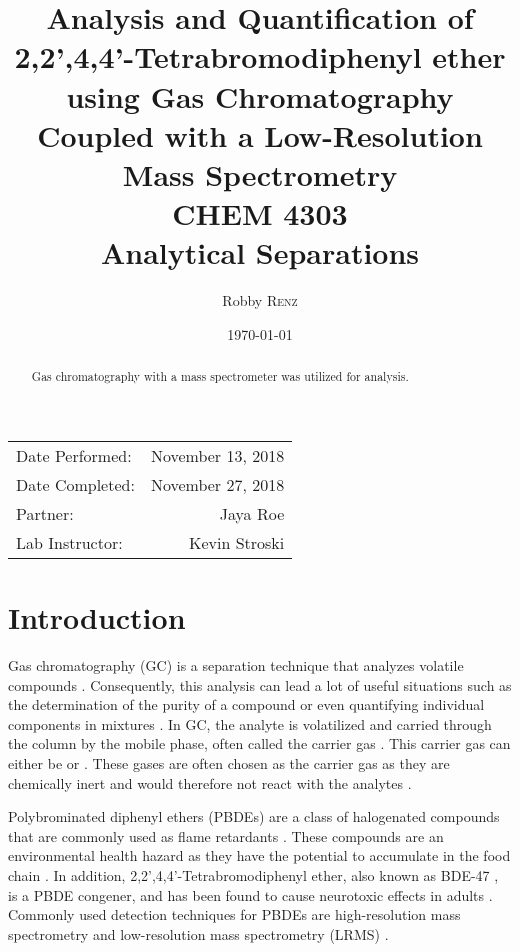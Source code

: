 \documentclass[a4paper, 12pt]{article}
\title{Analysis and Quantification of 2,2',4,4'-Tetrabromodiphenyl ether using Gas Chromatography Coupled with a Low-Resolution Mass Spectrometry \\ CHEM 4303 \\ Analytical Separations} %
\author{Robby \textsc{Renz}} %
\date{\today} %
\begin{document}
\maketitle %

\begin{center}
	\begin{tabular}{l r}
		Date Performed: & November 13, 2018 \\ %
		Date Completed: & November 27, 2018 \\
		Partner: & Jaya Roe \\ %
		Lab Instructor: & Kevin Stroski %
	\end{tabular}
\end{center}


\begin{abstract}
	Gas chromatography with a mass spectrometer was utilized for analysis.
\end{abstract}
\newpage


\section{Introduction}
Gas chromatography (GC) is a separation technique that analyzes volatile compounds \cite{vitha_chromatography:_2017}. Consequently, this analysis can lead a lot of useful situations such as the determination of the purity of a compound or even quantifying individual components in mixtures \cite{vitha_chromatography:_2017}. In GC, the analyte is volatilized and carried through the column by the mobile phase, often called the carrier gas \cite{harris}. This carrier gas can either be  or  \cite{harris}. These gases are often chosen as the carrier gas as they are chemically inert and would therefore not react with the analytes \cite{vitha_chromatography:_2017}.

Polybrominated diphenyl ethers (PBDEs) are a class of halogenated compounds that are commonly used as flame retardants \cite{bjorklund_mass_2003}. These compounds are an environmental health hazard as they have the potential to accumulate in the food chain \cite{thomsen_comparing_2002}. In addition, 2,2',4,4'-Tetrabromodiphenyl ether, also known as BDE-47 \cite{rat}, is a PBDE congener, and has been found to cause neurotoxic effects in adults \cite{thomsen_comparing_2002}. Commonly used detection techniques for PBDEs are high-resolution mass spectrometry and low-resolution mass spectrometry (LRMS) \cite{bjorklund_mass_2003}.
\end{document}
